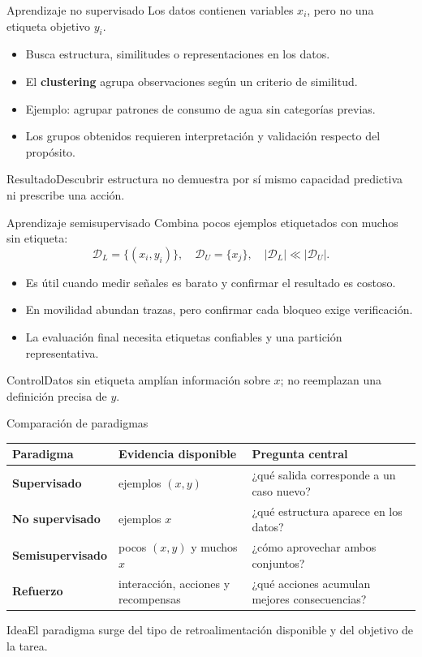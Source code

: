 \documentclass[aspectratio=169,10pt]{beamer}
\newcommand{\concepto}[1]{\textcolor{UAPTeal}{\textbf{#1}}}
\begin{document}
\begin{frame}{Aprendizaje no supervisado}
  \small Los datos contienen variables $x_i$, pero no una etiqueta objetivo $y_i$.
  \begin{itemize}
    \item Busca estructura, similitudes o representaciones en los datos.
    \item El \concepto{clustering} agrupa observaciones según un criterio de similitud.
    \item Ejemplo: agrupar patrones de consumo de agua sin categorías previas.
    \item Los grupos obtenidos requieren interpretación y validación respecto del propósito.
  \end{itemize}
  \begin{block}{Resultado}Descubrir estructura no demuestra por sí mismo capacidad predictiva ni prescribe una acción.\end{block}
\end{frame}

\begin{frame}{Aprendizaje semisupervisado}
  \small Combina pocos ejemplos etiquetados con muchos sin etiqueta:
  \[\mathcal{D}_L=\{(x_i,y_i)\},\quad\mathcal{D}_U=\{x_j\},\quad |\mathcal{D}_L|\ll|\mathcal{D}_U|.\]
  \begin{itemize}
    \item Es útil cuando medir señales es barato y confirmar el resultado es costoso.
    \item En movilidad abundan trazas, pero confirmar cada bloqueo exige verificación.
    \item La evaluación final necesita etiquetas confiables y una partición representativa.
  \end{itemize}
  \begin{alertblock}{Control}Datos sin etiqueta amplían información sobre $x$; no reemplazan una definición precisa de $y$.\end{alertblock}
\end{frame}

\begin{frame}{Comparación de paradigmas}
  \scriptsize
  \begin{tabularx}{\textwidth}{>{\bfseries}p{}p{}X}\toprule
  Paradigma & Evidencia disponible & Pregunta central\\\midrule
  Supervisado & ejemplos $(x,y)$ & ¿qué salida corresponde a un caso nuevo?\\
  No supervisado & ejemplos $x$ & ¿qué estructura aparece en los datos?\\
  Semisupervisado & pocos $(x,y)$ y muchos $x$ & ¿cómo aprovechar ambos conjuntos?\\
  Refuerzo & interacción, acciones y recompensas & ¿qué acciones acumulan mejores consecuencias?\\\bottomrule
  \end{tabularx}
  \begin{block}{Idea}El paradigma surge del tipo de retroalimentación disponible y del objetivo de la tarea.\end{block}
\end{frame}
\end{document}
